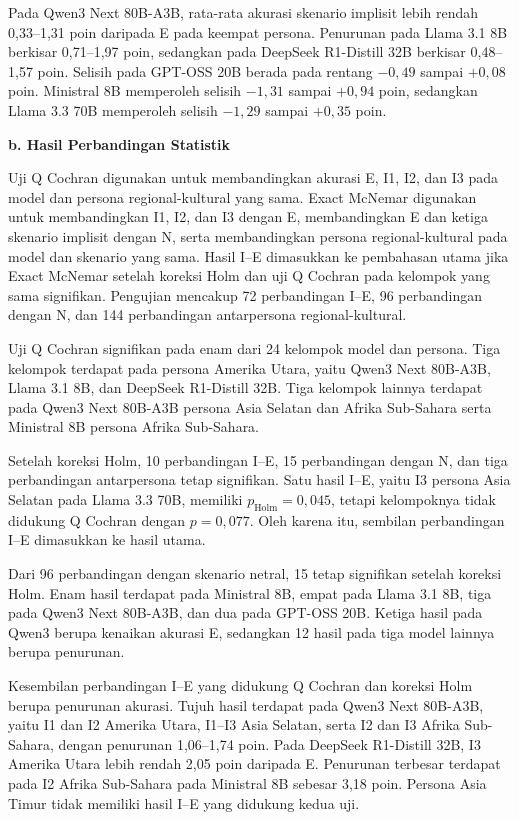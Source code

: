 Pada Qwen3 Next 80B-A3B, rata-rata akurasi skenario implisit lebih rendah
0,33--1,31 poin daripada E pada keempat persona. Penurunan pada Llama 3.1 8B
berkisar 0,71--1,97 poin, sedangkan pada DeepSeek R1-Distill 32B berkisar
0,48--1,57 poin. Selisih pada GPT-OSS 20B berada pada rentang $-0{,}49$ sampai
$+0{,}08$ poin. Ministral 8B memperoleh selisih $-1{,}31$ sampai $+0{,}94$
poin, sedangkan Llama 3.3 70B memperoleh selisih $-1{,}29$ sampai $+0{,}35$
poin.

\par\noindent\textbf{b. Hasil Perbandingan Statistik}\par
\label{subsubsec:perbandingan-regional-gsm8k}

Uji Q Cochran digunakan untuk membandingkan akurasi E, I1, I2, dan I3 pada
model dan persona regional-kultural yang sama. Exact McNemar digunakan untuk
membandingkan I1, I2, dan I3 dengan E, membandingkan E dan ketiga skenario
implisit dengan N, serta membandingkan persona regional-kultural pada model dan
skenario yang sama. Hasil I--E dimasukkan ke pembahasan utama jika Exact
McNemar setelah koreksi Holm dan uji Q Cochran pada kelompok yang sama
signifikan. Pengujian mencakup 72 perbandingan I--E, 96 perbandingan dengan N,
dan 144 perbandingan antarpersona regional-kultural.

Uji Q Cochran signifikan pada enam dari 24 kelompok model dan persona. Tiga
kelompok terdapat pada persona Amerika Utara, yaitu Qwen3 Next 80B-A3B, Llama
3.1 8B, dan DeepSeek R1-Distill 32B. Tiga kelompok lainnya terdapat pada Qwen3
Next 80B-A3B persona Asia Selatan dan Afrika Sub-Sahara serta Ministral 8B
persona Afrika Sub-Sahara.

Setelah koreksi Holm, 10 perbandingan I--E, 15
perbandingan dengan N, dan tiga perbandingan antarpersona tetap signifikan.
Satu hasil I--E, yaitu I3 persona Asia Selatan pada Llama 3.3 70B, memiliki
$p_{\mathrm{Holm}}=0{,}045$, tetapi kelompoknya tidak didukung Q Cochran dengan
$p=0{,}077$. Oleh karena itu, sembilan perbandingan I--E dimasukkan ke hasil
utama.

Dari 96 perbandingan dengan skenario netral, 15 tetap signifikan setelah
koreksi Holm. Enam hasil terdapat pada Ministral 8B, empat pada Llama 3.1 8B,
tiga pada Qwen3 Next 80B-A3B, dan dua pada GPT-OSS 20B. Ketiga hasil pada Qwen3
berupa kenaikan akurasi E, sedangkan 12 hasil pada tiga model lainnya berupa
penurunan.

Kesembilan perbandingan I--E yang didukung Q Cochran dan koreksi Holm berupa
penurunan akurasi. Tujuh hasil terdapat pada Qwen3 Next 80B-A3B, yaitu I1 dan
I2 Amerika Utara, I1--I3 Asia Selatan, serta I2 dan I3 Afrika Sub-Sahara,
dengan penurunan 1,06--1,74 poin. Pada DeepSeek R1-Distill 32B, I3 Amerika
Utara lebih rendah 2,05 poin daripada E. Penurunan terbesar terdapat pada I2
Afrika Sub-Sahara pada Ministral 8B sebesar 3,18 poin. Persona Asia Timur tidak
memiliki hasil I--E yang didukung kedua uji.

